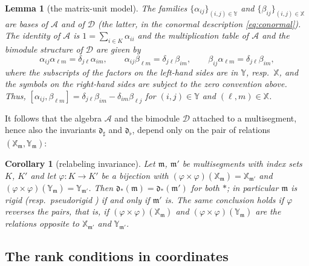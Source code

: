 \documentclass[12pt]{article}
\def\xspace{ }%
\newtheorem{lemma}[lemma]{Lemma}
\newtheorem{corollary}[corollary]{Corollary}
\theoremstyle{definition}
\newcommand{\prig}{pseudorigid\xspace}
\newcommand{\prigity}{pseudorigidity\xspace}
\newcommand{\mm}{\mathfrak{m}}
\newcommand{\alg}{\mathcal{A}}   %
\newcommand{\bmdl}{\mathcal{D}}   %
\newcommand{\XX}{\mathbb{X}}  %
\newcommand{\YY}{\mathbb{Y}}  %
\newcommand{\Kk}{K}         %
\newcommand{\algbss}{\alpha}     %
\newcommand{\bmdlbss}{\beta}    %
\newcommand{\dfr}{\mathfrak{d}}  %
\newcommand{\rsub}{\sharp}       %
\newcommand{\psub}{\flat}        %
\begin{document}
\begin{lemma}[the matrix-unit model]\label{lem:alg}
The families $\{\algbss_{ij}\}_{(i,j)\in\YY}$ and
$\{\bmdlbss_{ij}\}_{(i,j)\in\XX}$ are bases of $\alg$ and of $\bmdl$ (the latter, in the conormal description \eqref{eq:conormal}).
The identity of $\alg$ is $1 =\sum_{i \in \Kk}\algbss_{ii}$ and
the multiplication table of $\alg$ and the bimodule structure of $\bmdl$ are given by
\begin{equation}\label{eq:units}
   \algbss_{ij}\algbss_{\ell m} = \delta_{j\ell}\algbss_{im},
   \qquad
   \algbss_{ij}\bmdlbss_{\ell m} = \delta_{j\ell}\bmdlbss_{im},
   \qquad
   \bmdlbss_{ij}\algbss_{\ell m} = \delta_{j\ell}\bmdlbss_{im},
\end{equation}
where the subscripts of the factors on the left-hand sides are in $\YY$, resp.\ $\XX$,
and the symbols on the right-hand sides are subject to the zero convention above.
Thus, $[\algbss_{ij},\bmdlbss_{\ell m}] = \delta_{j\ell}\bmdlbss_{im} -\delta_{im}\bmdlbss_{\ell j}$ for
$(i,j)\in\YY$ and $(\ell,m)\in\XX$.
\end{lemma}

It follows that the algebra $\alg$ and the bimodule $\bmdl$ attached to a
multisegment, hence also the invariants $\dfr_\rsub$ and $\dfr_\psub$,
depend only on the pair of relations $(\XX_\mm, \YY_\mm)$:

\begin{corollary}[relabeling invariance]\label{cor:relinv}
Let $\mm$, $\mm'$ be multisegments with index sets $\Kk$, $\Kk'$ and let
$\varphi : \Kk \to \Kk'$ be a bijection with $(\varphi\times\varphi)(\XX_\mm) =
\XX_{\mm'}$ and $(\varphi\times\varphi)(\YY_\mm) = \YY_{\mm'}$. Then
$\dfr_\ast(\mm) = \dfr_\ast(\mm')$ for both $\ast$; in particular $\mm$
is rigid (resp.\ \prig) if and only if $\mm'$ is. The same conclusion
holds if $\varphi$ reverses the pairs, that is, if
$(\varphi\times\varphi)(\XX_\mm)$ and $(\varphi\times\varphi)(\YY_\mm)$
are the relations opposite to $\XX_{\mm'}$ and $\YY_{\mm'}$.
\end{corollary}

\subsection{The rank conditions in coordinates}
\end{document}
